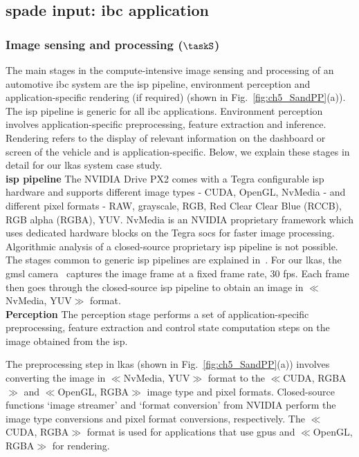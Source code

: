 \subsection{\Gls{spade} input: \gls{ibc} application}
\subsubsection{Image sensing and processing ($\taskS$)}
The main stages in the compute-intensive image sensing and processing of an automotive \gls{ibc} system are the \gls{isp} pipeline, environment perception and application-specific rendering (if required) (shown in Fig.~\ref{fig:ch5_SandPP}(a)). The \gls{isp} pipeline is generic for all \gls{ibc} applications. Environment perception involves application-specific preprocessing, feature extraction and inference. Rendering refers to the display of relevant information on the dashboard or screen of the vehicle and is application-specific. Below, we explain these stages in detail for our \gls{lkas} system case study. 
\\[1ex]
\noindent\textbf{\Acrfull{isp} pipeline} 
The NVIDIA Drive PX2 comes with a Tegra configurable \gls{isp} hardware and supports different image types - CUDA, OpenGL, NvMedia - and different pixel formats - RAW, grayscale, RGB, Red Clear Clear Blue (RCCB), RGB alpha (RGBA),  YUV. NvMedia is an NVIDIA proprietary framework which uses dedicated hardware blocks on the Tegra \glspl{soc} for faster image processing.  Algorithmic analysis of a closed-source proprietary \gls{isp} pipeline is not possible. The stages common to generic \gls{isp} pipelines are explained in~\cite{buckler}.
For our \gls{lkas}, the \gls{gmsl} camera~\cite{nvidiadrive} captures the image frame at a fixed frame rate, 30 fps. Each frame then goes through the closed-source \gls{isp} pipeline to obtain an image in $\ll$NvMedia, YUV$\gg$ format. 
\\[1ex]
\noindent\textbf{Perception} 
The perception stage performs a set of application-specific preprocessing, feature extraction and control state computation steps on the image obtained from the \gls{isp}. 

The preprocessing step in \gls{lkas} (shown in Fig.~\ref{fig:ch5_SandPP}(a)) involves converting the image in $\ll$NvMedia, YUV$\gg$ format to the $\ll$CUDA, RGBA$\gg$ and $\ll$OpenGL, RGBA$\gg$ image type and pixel formats. Closed-source functions `image streamer' and `format conversion' from NVIDIA perform the image type conversions and pixel format conversions, respectively. The $\ll$CUDA, RGBA$\gg$ format is used for applications that use \glspl{gpu} and $\ll$OpenGL, RGBA$\gg$ for rendering.

